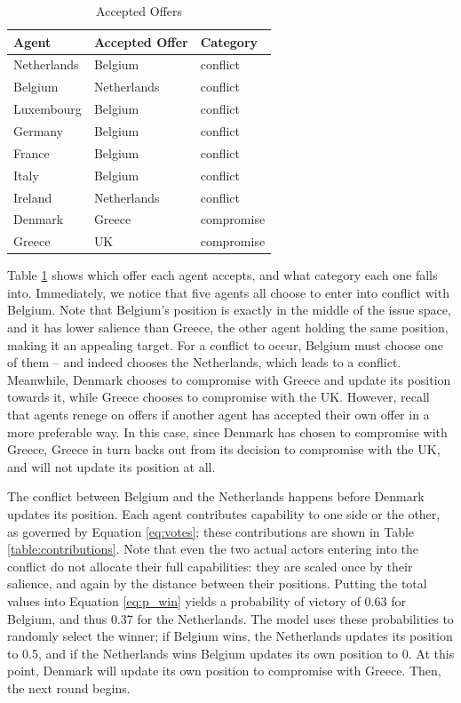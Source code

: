 \begin{table}
\centering
    \caption{Accepted Offers}
    \label{eg_offers}
\begin{tabular}{lll}
    \hline
    Agent &  Accepted Offer & Category \\
    \hline
    Netherlands & Belgium & conflict \\
    Belgium & Netherlands & conflict \\
    Luxembourg & Belgium & conflict \\
    Germany & Belgium & conflict \\
    France & Belgium & conflict \\
    Italy & Belgium & conflict \\
    Ireland & Netherlands & conflict \\
    Denmark & Greece & compromise \\
    Greece & UK & compromise \\
    \hline
\end{tabular}
\tableSpace

\end{table}

Table \ref{eg_offers} shows which offer each agent accepts, and what category each one falls into. Immediately, we notice that five agents all choose to enter into conflict with Belgium. Note that Belgium's position is exactly in the middle of the issue space, and it has lower salience than Greece, the other agent holding the same position, making it an appealing target. For a conflict to occur, Belgium must choose one of them -- and indeed chooses the Netherlands, which leads to a conflict. Meanwhile, Denmark chooses to compromise with Greece and update its position towards it, while Greece chooses to compromise with the UK. However, recall that agents renege on offers if another agent has accepted their own offer in a more preferable way. In this case, since Denmark has chosen to compromise with Greece, Greece in turn backs out from its decision to compromise with the UK, and will not update its position at all.

The conflict between Belgium and the Netherlands happens before Denmark updates its position. Each agent contributes capability to one side or the other, as governed by Equation \ref{eq:votes}; these contributions are shown in Table \ref{table:contributions}. Note that even the two actual actors entering into the conflict do not allocate their full capabilities: they are scaled once by their salience, and again by the distance between their positions. Putting the total values into Equation \ref{eq:p_win} yields a probability of victory of 0.63 for Belgium, and thus 0.37 for the Netherlands. The model uses these probabilities to randomly select the winner; if Belgium wins, the Netherlands updates its position to 0.5, and if the Netherlands wins Belgium updates its own position to 0. At this point, Denmark will update its own position to compromise with Greece. Then, the next round begins.

